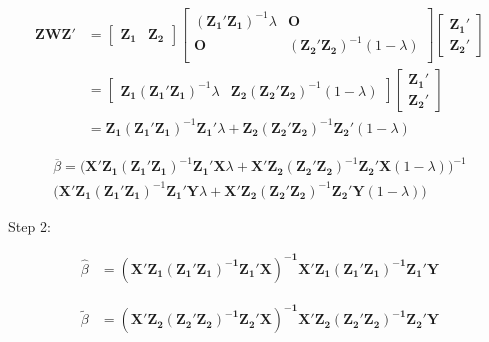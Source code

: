 \documentclass[14pt]{extreport}
\begin{document}
\begin{enumerate}
    \begin{align*}
        \mathbf{ZWZ}' &= 
        \begin{bmatrix}
        \mathbf{Z_1} & \mathbf{Z_2}
        \end{bmatrix} 
        \begin{bmatrix}
        (\mathbf{Z_1}'\mathbf{Z_1})^{-1}\lambda & \mathbf{O} \\
        \mathbf{O} & (\mathbf{Z_2}'\mathbf{Z_2})^{-1}(1-\lambda) \\
        \end{bmatrix}
        \begin{bmatrix}
        \mathbf{Z_1}' \\
        \mathbf{Z_2}'
        \end{bmatrix} \\
        &= 
        \begin{bmatrix}
        \mathbf{Z_1}(\mathbf{Z_1}'\mathbf{Z_1})^{-1}\lambda & \mathbf{Z_2}(\mathbf{Z_2}'\mathbf{Z_2})^{-1}(1-\lambda)
        \end{bmatrix}
        \begin{bmatrix}
        \mathbf{Z_1}' \\
        \mathbf{Z_2}'
        \end{bmatrix} \\
        &= \mathbf{Z_1}(\mathbf{Z_1}'\mathbf{Z_1})^{-1}\mathbf{Z_1}'\lambda + \mathbf{Z_2}(\mathbf{Z_2}'\mathbf{Z_2})^{-1}\mathbf{Z_2}'(1-\lambda)
    \end{align*}

    \begin{multline*}
        \overline{\beta} = \Big(\mathbf{X}'\mathbf{Z_1}(\mathbf{Z_1}'\mathbf{Z_1})^{-1}\mathbf{Z_1}'\mathbf{X}\lambda + \mathbf{X}'\mathbf{Z_2}(\mathbf{Z_2}'\mathbf{Z_2})^{-1}\mathbf{Z_2}'\mathbf{X}(1-\lambda)\Big)^{-1} \\ \Big(\mathbf{X}'\mathbf{Z_1}(\mathbf{Z_1}'\mathbf{Z_1})^{-1}\mathbf{Z_1}'\mathbf{Y}\lambda + \mathbf{X}'\mathbf{Z_2}(\mathbf{Z_2}'\mathbf{Z_2})^{-1}\mathbf{Z_2}'\mathbf{Y}(1-\lambda)\Big)
    \end{multline*}

    Step 2: 

    \begin{align*}
        \widehat{\beta} &= \mathbf{(X'Z_1(Z_1'Z_1)^{-1}Z_1'X)^{-1}X'Z_1(Z_1'Z_1)^{-1}Z_1'Y}
    \end{align*}

    \begin{align*}
        \widetilde{\beta} &= \mathbf{(X'Z_2(Z_2'Z_2)^{-1}Z_2'X)^{-1}X'Z_2(Z_2'Z_2)^{-1}Z_2'Y}
    \end{align*}


\end{enumerate}
\end{document}
